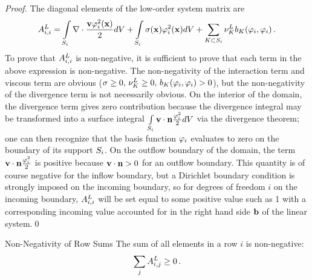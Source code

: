 \begin{proof}
The diagonal elements of the low-order system matrix are
\[
  \ssmatrixletter^L_{i,i} = \intSi\nabla\cdot
  \frac{\velocity\testfunction_i^2(\x)}{2}d\volume
  + \intSi\sigma(\x)\testfunction_i^2(\x)d\volume
  + \sumKSi\lowordercellviscosity \localviscbilinearform{\cell}{i}{i} \eqp
\]
To prove that $A^L_{i,i}$ is non-negative, it is sufficient to
prove that each term in the above expression is non-negative. The
non-negativity of the interaction term and viscous term are obvious
($\reactioncoef \ge 0, \, \lowordercellviscosity\ge 0, \,
\localviscbilinearform{\cell}{i}{i}>0$), but the non-negativity of the divergence
term is not necessarily obvious. On the interior of the domain, the divergence
term gives zero contribution because the divergence integral may be transformed
into a surface integral
$\int\limits_{S_i}\mathbf{v}\cdot\mathbf{n}\frac{\varphi_i^2}{2} dV$ via the
divergence theorem; one can then recognize that the basis function
$\varphi_i$ evaluates to zero on the boundary of its support
$S_i$. On the outflow boundary of the domain, the term
$\mathbf{v}\cdot\mathbf{n} \frac{\varphi_i^2}{2}$ is positive because
$\mathbf{v}\cdot\mathbf{n} > 0$ for an outflow boundary. This quantity is of
course negative for the inflow boundary, but a Dirichlet boundary condition is
strongly imposed on the incoming boundary, so for degrees of freedom $i$ on the
incoming boundary, $A^L_{i,i}$ will be set equal to some positive
value such as 1 with a corresponding incoming value accounted for in the right
hand side $\ssrhs$ of the linear system.\qed
\end{proof}
\begin{lemma}{Non-Negativity of Row Sums}
   The sum of all elements in a row $i$ is non-negative:
   \[
     \sum\limits_j A^L_{i,j} \ge 0 \,.
   \]
\end{lemma}

